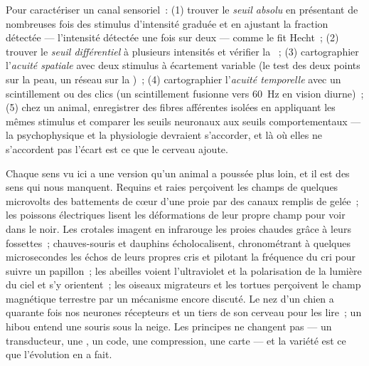 \begin{method}\label{met:b3:sensory-systems:psychophysics}
Pour caractériser un canal sensoriel~: (1) trouver le \emph{seuil
absolu} en présentant de nombreuses fois des stimulus d'intensité
graduée et en ajustant la fraction détectée --- l'intensité détectée une
fois sur deux --- comme le fit Hecht~; (2) trouver le \emph{seuil
différentiel} à plusieurs intensités et vérifier la ~; (3)
cartographier l'\emph{acuité spatiale} avec deux stimulus à écartement
variable (le test des deux points sur la peau, un réseau sur la
)~; (4) cartographier l'\emph{acuité temporelle} avec un
scintillement ou des clics (un scintillement fusionne vers \qty{60}{Hz}
en vision diurne)~; (5) chez un animal, enregistrer des fibres
afférentes isolées en appliquant les mêmes stimulus et comparer les
seuils neuronaux aux seuils comportementaux --- la psychophysique et la
physiologie devraient s'accorder, et là où elles ne s'accordent pas
l'écart est ce que le cerveau ajoute.
\end{method}

\begin{remark}\label{rem:b3:sensory-systems:others}
Chaque sens vu ici a une version qu'un animal a poussée plus loin, et il
est des sens qui nous manquent. Requins et raies perçoivent les champs
de quelques microvolts des battements de cœur d'une proie par des canaux
remplis de gelée~; les poissons électriques lisent les déformations de
leur propre champ pour voir dans le noir. Les crotales imagent en
infrarouge les proies chaudes grâce à leurs fossettes~; chauves-souris
et dauphins écholocalisent, chronométrant à quelques microsecondes les
échos de leurs propres cris et pilotant la fréquence du cri pour suivre
un papillon~; les abeilles voient l'ultraviolet et la polarisation de la
lumière du ciel et s'y orientent~; les oiseaux migrateurs et les tortues
perçoivent le champ magnétique terrestre par un mécanisme encore
discuté. Le nez d'un chien a quarante fois nos neurones récepteurs et un
tiers de son cerveau pour les lire~; un hibou entend une souris sous la
neige. Les principes ne changent pas --- un transducteur, une , un code, une compression, une carte --- et la variété est ce
que l'évolution en a fait.
\end{remark}


